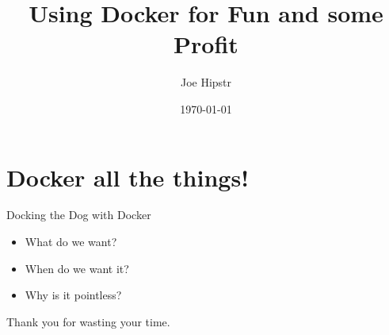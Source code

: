 \documentclass{beamer}
\title{Using Docker for Fun and some Profit}
\date{\today}
\author{Joe Hipstr}
\institute{Docker Conference No. 668839}
\begin{document}
\maketitle

\section{Docker all the things!}
\begin{frame}{Docking the Dog with Docker}

 \begin{itemize}
    \item What do we want?
    \item When do we want it?
    \item Why is it pointless?
 \end{itemize}
\end{frame}

\begin{frame}[standout]
    Thank you for wasting your time.
\end{frame}
\end{document}
